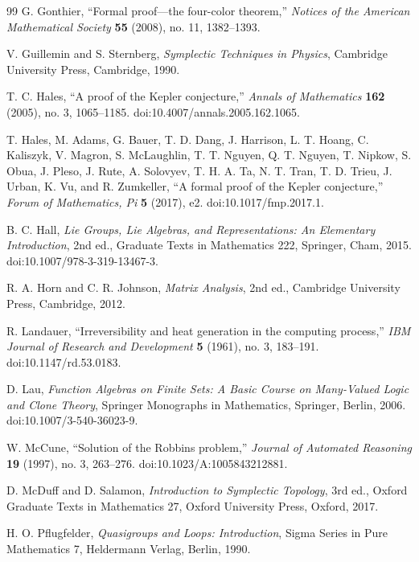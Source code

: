 \documentclass[11pt]{article}
\theoremstyle{definition}
\begin{document}
\begin{thebibliography}{99}
 G. Gonthier, ``Formal proof---the four-color theorem,'' \emph{Notices of
the American Mathematical Society} \textbf{55} (2008), no. 11,
1382--1393.

 V. Guillemin and S. Sternberg, \emph{Symplectic Techniques in Physics},
Cambridge University Press, Cambridge, 1990.

 T. C. Hales, ``A proof of the Kepler conjecture,'' \emph{Annals of
Mathematics} \textbf{162} (2005), no. 3, 1065--1185.
doi:10.4007/annals.2005.162.1065.

 T. Hales, M. Adams, G. Bauer, T. D. Dang, J. Harrison, L. T. Hoang, C.
Kaliszyk, V. Magron, S. McLaughlin, T. T. Nguyen, Q. T. Nguyen, T.
Nipkow, S. Obua, J. Pleso, J. Rute, A. Solovyev, T. H. A. Ta, N. T.
Tran, T. D. Trieu, J. Urban, K. Vu, and R. Zumkeller, ``A formal proof
of the Kepler conjecture,'' \emph{Forum of Mathematics, Pi} \textbf{5}
(2017), e2. doi:10.1017/fmp.2017.1.

 B. C. Hall, \emph{Lie Groups, Lie Algebras, and Representations: An
Elementary Introduction}, 2nd ed., Graduate Texts in Mathematics 222,
Springer, Cham, 2015. doi:10.1007/978-3-319-13467-3.

 R. A. Horn and C. R. Johnson, \emph{Matrix Analysis}, 2nd ed., Cambridge
University Press, Cambridge, 2012.

 R. Landauer, ``Irreversibility and heat generation in the computing
process,'' \emph{IBM Journal of Research and Development} \textbf{5}
(1961), no. 3, 183--191. doi:10.1147/rd.53.0183.

 D. Lau, \emph{Function Algebras on Finite Sets: A Basic Course on
Many-Valued Logic and Clone Theory}, Springer Monographs in Mathematics,
Springer, Berlin, 2006. doi:10.1007/3-540-36023-9.

 W. McCune, ``Solution of the Robbins problem,'' \emph{Journal of
Automated Reasoning} \textbf{19} (1997), no. 3, 263--276.
doi:10.1023/A:1005843212881.

 D. McDuff and D. Salamon, \emph{Introduction to Symplectic Topology},
3rd ed., Oxford Graduate Texts in Mathematics 27, Oxford University
Press, Oxford, 2017.

 H. O. Pflugfelder, \emph{Quasigroups and Loops: Introduction}, Sigma
Series in Pure Mathematics 7, Heldermann Verlag, Berlin, 1990.


\end{thebibliography}
\end{document}
